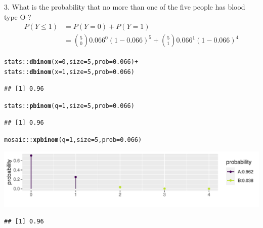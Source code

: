 \documentclass[10pt]{beamer}\usepackage[]{graphicx}\usepackage[]{color}
\makeatletter
\def\maxwidth{ %
  \ifdim\Gin@nat@width>\linewidth
    \linewidth
  \else
    \Gin@nat@width
  \fi
}
\newcommand{\hlnum}[1]{\textcolor[rgb]{0.686,0.059,0.569}{#1}}%
\newcommand{\hlopt}[1]{\textcolor[rgb]{0,0,0}{#1}}%
\newcommand{\hlstd}[1]{\textcolor[rgb]{0.345,0.345,0.345}{#1}}%
\newcommand{\hlkwc}[1]{\textcolor[rgb]{0.333,0.667,0.333}{#1}}%
\newcommand{\hlkwd}[1]{\textcolor[rgb]{0.737,0.353,0.396}{\textbf{#1}}}%
\newenvironment{kframe}{%
 \def\at@end@of@kframe{}%
 \ifinner\ifhmode%
  \def\at@end@of@kframe{\end{minipage}}%
  \begin{minipage}{\columnwidth}%
 \fi\fi%
 \def\FrameCommand##1{\hskip\@totalleftmargin \hskip-\fboxsep
 \colorbox{shadecolor}{##1}\hskip-\fboxsep
     \hskip-\linewidth \hskip-\@totalleftmargin \hskip\columnwidth}%
 \MakeFramed {\advance\hsize-\width
   \@totalleftmargin\z@ \linewidth\hsize
   \@setminipage}}%
 {\par\unskip\endMakeFramed%
 \at@end@of@kframe}
\newenvironment{knitrout}{}{} %
\makeatother
\begin{document}
\begin{frame}[fragile]{3. What is the probability that no more than one of the five people has blood type O-?}
	\footnotesize
	\begin{align*}
	P(Y \leq 1) & = P(Y = 0) + P(Y = 1) \\
	& = \binom{5}{0} 0.066^0 (1- 0.066)^5 + \binom{5}{1} 0.066^1 (1- 0.066)^4
	\end{align*}
	
	
\begin{knitrout}\tiny
{}\color{fgcolor}\begin{kframe}
\begin{alltt}
\hlstd{stats}\hlopt{::}\hlkwd{dbinom}\hlstd{(}\hlkwc{x} \hlstd{=} \hlnum{0}\hlstd{,} \hlkwc{size} \hlstd{=} \hlnum{5}\hlstd{,} \hlkwc{prob} \hlstd{=} \hlnum{0.066}\hlstd{)} \hlopt{+}
\hlstd{stats}\hlopt{::}\hlkwd{dbinom}\hlstd{(}\hlkwc{x} \hlstd{=} \hlnum{1}\hlstd{,} \hlkwc{size} \hlstd{=} \hlnum{5}\hlstd{,} \hlkwc{prob} \hlstd{=} \hlnum{0.066}\hlstd{)}
\end{alltt}
\begin{verbatim}
## [1] 0.96
\end{verbatim}
\begin{alltt}
\hlstd{stats}\hlopt{::}\hlkwd{pbinom}\hlstd{(}\hlkwc{q} \hlstd{=} \hlnum{1}\hlstd{,} \hlkwc{size} \hlstd{=} \hlnum{5}\hlstd{,} \hlkwc{prob} \hlstd{=} \hlnum{0.066}\hlstd{)}
\end{alltt}
\begin{verbatim}
## [1] 0.96
\end{verbatim}
\begin{alltt}
\hlstd{mosaic}\hlopt{::}\hlkwd{xpbinom}\hlstd{(}\hlkwc{q} \hlstd{=} \hlnum{1}\hlstd{,} \hlkwc{size} \hlstd{=} \hlnum{5}\hlstd{,} \hlkwc{prob} \hlstd{=} \hlnum{0.066}\hlstd{)}
\end{alltt}
\end{kframe}

{\centering \includegraphics[width=\maxwidth]{figure/unnamed-chunk-11-1} 

}


\begin{kframe}\begin{verbatim}
## [1] 0.96
\end{verbatim}
\end{kframe}
\end{knitrout}
	
\end{frame}
\end{document}
